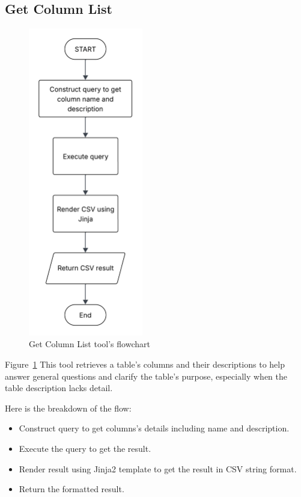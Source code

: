     \subsection{Get Column List}
    \label{sec:get_column_list}
    \begin{figure}[H]
      \centering
      \includegraphics[width=5cm]{chapters/3/figures/get_column_list.png}
      \caption[Get Column List tool’s flowchart]{Get Column List tool’s flowchart}
        \label{fig:get_column_list}
    \end{figure}
    Figure~\ref{fig:get_column_list} This tool retrieves a table’s columns and their descriptions to help answer general questions and clarify the table’s purpose, especially when the table description lacks detail.

    Here is the breakdown of the flow:
    \begin{itemize}
      \item Construct query to get columns's details including name and description.
      \item Execute the query to get the result.
      \item Render result using Jinja2 template to get the result in CSV string format.
      \item Return the formatted result.
    \end{itemize}
\pagebreak
